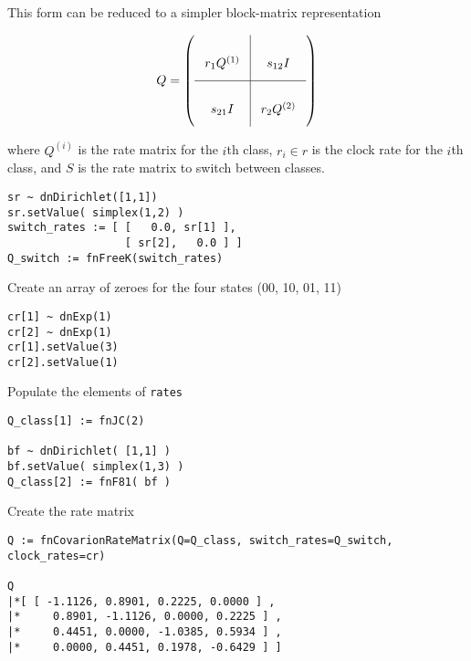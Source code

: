 This form can be reduced to a simpler block-matrix representation

\begin{equation*}
Q = \left(
\arraycolsep=8pt\def\arraystretch{3.0}
\begin{array}{c|c}
r_1 Q^{(1)} & s_{12} I  \\
\hline
s_{21} I & r_2 Q^{(2)} \\
\end{array}
\right)
\end{equation*}


where $Q^{(i)}$ is the rate matrix for the $i$th class, $r_i \in r$ is the clock rate for the $i$th class, and $S$ is the rate matrix to switch between classes.


{\tt \begin{snugshade*}
\begin{lstlisting}
sr ~ dnDirichlet([1,1])
sr.setValue( simplex(1,2) )
switch_rates := [ [   0.0, sr[1] ],
                  [ sr[2],   0.0 ] ]
Q_switch := fnFreeK(switch_rates)
\end{lstlisting}
\end{snugshade*}}

Create an array of zeroes for the four states (00, 10, 01, 11)

{\tt \begin{snugshade*}
\begin{lstlisting}
cr[1] ~ dnExp(1)
cr[2] ~ dnExp(1)
cr[1].setValue(3)
cr[2].setValue(1)
\end{lstlisting}
\end{snugshade*}}

Populate the elements of {\tt rates}

{\tt \begin{snugshade*}
\begin{lstlisting}
Q_class[1] := fnJC(2)

bf ~ dnDirichlet( [1,1] )
bf.setValue( simplex(1,3) )
Q_class[2] := fnF81( bf )

\end{lstlisting}
\end{snugshade*}}

Create the rate matrix

{\tt \begin{snugshade*}
\begin{lstlisting}
Q := fnCovarionRateMatrix(Q=Q_class, switch_rates=Q_switch, clock_rates=cr)

Q
|*[ [ -1.1126, 0.8901, 0.2225, 0.0000 ] ,
|*     0.8901, -1.1126, 0.0000, 0.2225 ] ,
|*     0.4451, 0.0000, -1.0385, 0.5934 ] ,
|*     0.0000, 0.4451, 0.1978, -0.6429 ] ]
\end{lstlisting}
\end{snugshade*}}

